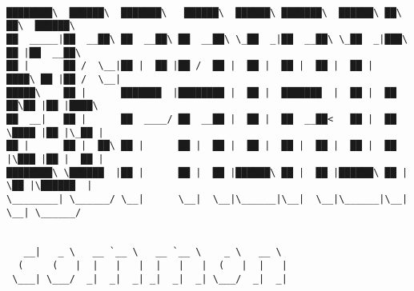 \documentclass[varwidth=\maxdimen,margin=0.5cm,multi={verbatim}]{standalone}
\begin{document}
\begin{verbatim}

████████\  ██████\  ███████\   ██████\  ██████\ ███████\  ██████\ ██\   ██\  ██████\
██  _____|██  __██\ ██  __██\ ██  __██\ \_██  _|██  __██\ \_██  _|███\  ██ |██  __██\
██ |      ██ /  \__|██ |  ██ |██ /  ██ |  ██ |  ██ |  ██ |  ██ |  ████\ ██ |██ /  \__|
█████\    ██ |      ███████  |████████ |  ██ |  ███████  |  ██ |  ██ ██\██ |██ |████\
██  __|   ██ |      ██  ____/ ██  __██ |  ██ |  ██  __██<   ██ |  ██ \████ |██ |\_██ |
██ |      ██ |  ██\ ██ |      ██ |  ██ |  ██ |  ██ |  ██ |  ██ |  ██ |\███ |██ |  ██ |
████████\ \██████  |██ |      ██ |  ██ |██████\ ██ |  ██ |██████\ ██ | \██ |\██████  |
\________| \______/ \__|      \__|  \__|\______|\__|  \__|\______|\__|  \__| \______/

                                                  
   __|   _ \   __ `__ \   __ `__ \    _ \   __ \
  (     (   |  |   |   |  |   |   |  (   |  |   |
 \___| \___/  _|  _|  _| _|  _|  _| \___/  _|  _|



\end{verbatim}
\end{document}
